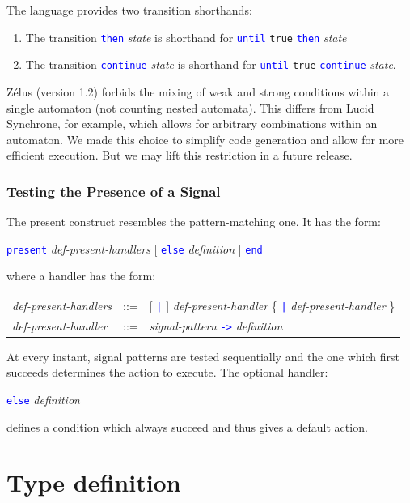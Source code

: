 \documentclass[11pt,titlepage,twoside]{report}
\newcommand{\zelus}{{\sf Z\'elus}}
\newcommand{\lucy}{{\sf Lucid Synchrone}}
\newcommand{\Then}{\mbox{{\tt then}}}
\newcommand{\Until}{\mbox{\tt until}}
\newcommand{\Continue}{\mbox{\tt continue}}
\newcommand{\term}[1]{\textcolor{Blue}{\tt #1}}
\newcommand{\nterm}[1]{\textcolor{BrickRed}{\it #1}}
\newcommand{\term}[1]{{\tt #1}}
\newcommand{\nterm}[1]{{\em #1}}
\begin{document}
The language provides two transition shorthands:
\begin{enumerate}
\item
  The transition \term{\Then} \nterm{state} is shorthand for
  \term{\Until} {\tt true}
  \term{\Then} \nterm{state}
\item
  The transition \term{\Continue} \nterm{state} is shorthand
  for \term{\Until} {\tt true} \term{\Continue} \nterm{state}.
\end{enumerate}

\zelus{} (version 1.2) forbids the mixing of weak and strong conditions 
within a single automaton (not counting nested automata).
This differs from \lucy, for example, which allows for arbitrary
combinations within an automaton. We made this choice to simplify code
generation and allow for more efficient execution.
But we may lift this restriction in a future release.

\subsubsection{Testing the Presence of a Signal}

The present construct resembles the pattern-matching one.
It has the form:
\begin{center}
  \term{present} \nterm{def-present-handlers} [ \term{else} \nterm{definition} ]
  \term{end}
\end{center}
where a handler has the form:
\begin{center}
\begin{tabular}{lcl}
\nterm{def-present-handlers}
   & ::=        & [ \term{|} ] \nterm{def-present-handler}
                  \{ \term{|} \nterm{def-present-handler} \} 
\\
\nterm{def-present-handler}
   & ::=        & \nterm{signal-pattern} \term{->} \nterm{definition}
\end{tabular}
\end{center}
At every instant, signal patterns are tested sequentially and the one which 
first succeeds determines the action to execute. The optional handler:
\begin{center} 
  \term{else} \nterm{definition}
\end{center}
defines a condition which always succeed and thus gives a default action.

\section{Type definition\label{langtypedefs}} %
\end{document}
